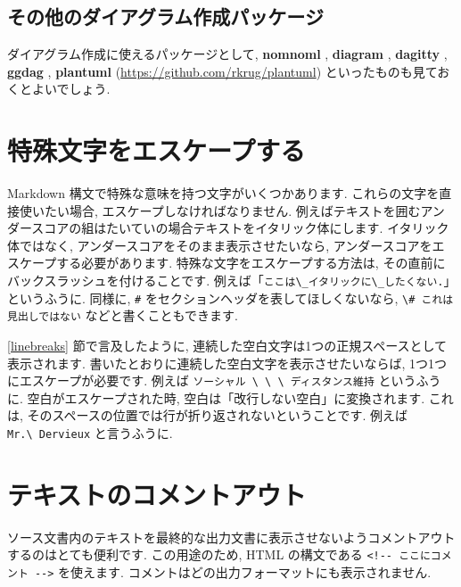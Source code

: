 \documentclass[
  11pt,
  lualatex,ja=standard,jafont=noto]{bxjsreport}
\begin{document}
\hypertarget{other-packages-for-making-diagrams}{%
\subsection{その他のダイアグラム作成パッケージ}\label{other-packages-for-making-diagrams}}

ダイアグラム作成に使えるパッケージとして, \textbf{nomnoml} \autocite{R-nomnoml}, \textbf{diagram} \autocite{R-diagram}, \textbf{dagitty} \autocite{R-dagitty}, \textbf{ggdag} \autocite{R-ggdag}, \textbf{plantuml} (\url{https://github.com/rkrug/plantuml}) といったものも見ておくとよいでしょう.

\hypertarget{special-chars}{%
\section{特殊文字をエスケープする}\label{special-chars}}

Markdown 構文で特殊な意味を持つ文字がいくつかあります. これらの文字を直接使いたい場合, エスケープしなければなりません. 例えばテキストを囲むアンダースコアの組はたいていの場合テキストをイタリック体にします. イタリック体ではなく, アンダースコアをそのまま表示させたいなら, アンダースコアをエスケープする必要があります. 特殊な文字をエスケープする方法は, その直前にバックスラッシュを付けることです. 例えば「\texttt{ここは\textbackslash{}\_イタリックに\textbackslash{}\_したくない.}」というふうに. 同様に, \texttt{\#} をセクションヘッダを表してほしくないなら, \texttt{\textbackslash{}\#\ これは見出しではない} などと書くこともできます.

\ref{linebreaks} 節で言及したように, 連続した空白文字は1つの正規スペースとして表示されます. 書いたとおりに連続した空白文字を表示させたいならば, 1つ1つにエスケープが必要です. 例えば \texttt{ソーシャル \textbackslash{}\ \textbackslash{}\ \textbackslash{}\ ディスタンス維持} というふうに. 空白がエスケープされた時, 空白は「改行しない空白」に変換されます. これは, そのスペースの位置では行が折り返されないということです. 例えば \texttt{Mr.\textbackslash{}\ Dervieux} と言うふうに.

\hypertarget{comments}{%
\section{テキストのコメントアウト}\label{comments}}

ソース文書内のテキストを最終的な出力文書に表示させないようコメントアウトするのはとても便利です. この用途のため, HTML の構文である \texttt{\textless{}!-\/-\ ここにコメント\ -\/-\textgreater{}} を使えます. コメントはどの出力フォーマットにも表示されません.
\end{document}

